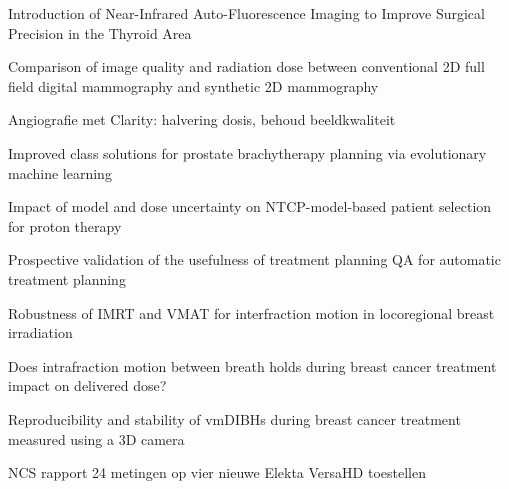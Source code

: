 \documentclass[a4paper,10pt]{report}
\begin{document}
\begin{multicols*}{3}

{} %
\begin{packed_enum}
\item[\#1] Introduction of Near-Infrared Auto-Fluorescence Imaging to Improve Surgical Precision in the Thyroid Area
\item[\#2] Comparison of image quality and radiation dose between conventional 2D full field digital mammography and synthetic 2D mammography
\item[\#3] Angiografie met Clarity: halvering dosis, behoud beeldkwaliteit
\item[\#4] Improved class solutions for prostate brachytherapy planning via evolutionary machine learning
\item[\#5] Impact of model and dose uncertainty on NTCP-model-based patient selection for proton therapy
\item[\#6] Prospective validation of the usefulness of treatment planning QA for  automatic treatment planning
\item[\#7] Robustness of IMRT and VMAT for interfraction motion in locoregional breast irradiation
\item[\#8] Does intrafraction motion between breath holds during breast cancer treatment impact on delivered dose?
\item[\#9] Reproducibility and stability of vmDIBHs during breast cancer treatment measured using a 3D camera
\item[\#10] NCS rapport 24 metingen op vier nieuwe Elekta VersaHD toestellen
\end{packed_enum} %



\end{multicols*}
\end{document}
